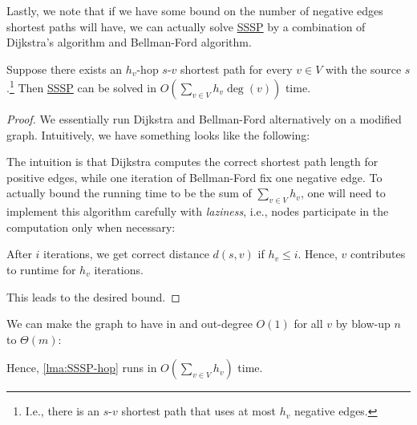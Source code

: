 Lastly, we note that if we have some bound on the number of negative edges shortest paths will have, we can actually solve \hyperref[prb:SSSP]{SSSP} by a combination of Dijkstra's algorithm and Bellman-Ford algorithm.

\begin{lemma}\label{lma:SSSP-hop}
	Suppose there exists an \(h_v\)-hop \(s\)-\(v\) shortest path for every \(v \in V\) with the source \(s\).\footnote{I.e., there is an \(s\)-\(v\) shortest path that uses at most \(h_v\) negative edges.} Then \hyperref[prb:SSSP]{SSSP} can be solved in \(O(\sum_{v \in V} h_v \deg(v))\) time.
\end{lemma}
\begin{proof}
	We essentially run Dijkstra and Bellman-Ford alternatively on a modified graph. Intuitively, we have something looks like the following:
	\begin{center}
	\end{center}
	The intuition is that Dijkstra computes the correct shortest path length for positive edges, while one iteration of Bellman-Ford fix one negative edge. To actually bound the running time to be the sum of \(\sum_{v \in V} h_v\), one will need to implement this algorithm carefully with \emph{laziness}, i.e., nodes participate in the computation only when necessary:
	\begin{claim}
		After \(i\) iterations, we get correct distance \(d(s, v)\) if \(h_v \leq i\). Hence, \(v\) contributes to runtime for \(h_v\) iterations.
	\end{claim}
	This leads to the desired bound.
\end{proof}

\begin{remark}
	We can make the graph to have in and out-degree \(O(1)\) for all \(v\) by blow-up \(n\) to \(\Theta (m)\):
	\begin{center}
	\end{center}
	Hence, \autoref{lma:SSSP-hop} runs in \(O(\sum_{v \in V} h_v)\) time.
\end{remark}